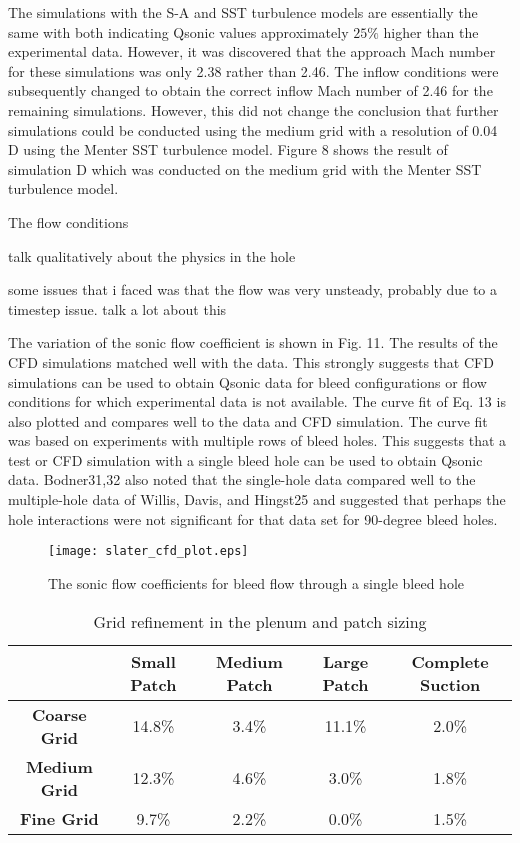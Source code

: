 The simulations with the S-A and SST turbulence models are essentially the same with both indicating Qsonic values approximately $25\%$ higher than the experimental data. However, it was discovered that the approach Mach number for these simulations was only 2.38 rather than 2.46. The inflow conditions were subsequently changed to obtain the correct inflow Mach number of 2.46 for the remaining simulations. However, this did not change the conclusion that further simulations could be conducted using the medium grid with a resolution of 0.04 D using the Menter SST turbulence model. Figure 8 shows the result of simulation D which was conducted on the medium grid with the Menter SST turbulence model.

The flow conditions 

talk qualitatively about the physics in the hole

some issues that i faced was that the flow was very unsteady, probably due to a timestep issue. talk a lot about this

The variation of the sonic flow coefficient is shown in Fig. 11. The results of the CFD simulations matched well with the data. This strongly suggests that CFD simulations can be used to obtain Qsonic data for bleed configurations or flow conditions for which experimental data is not available. The curve fit of Eq. 13 is also plotted and compares well to the data and CFD simulation. The curve fit was based on experiments with multiple rows of bleed holes. This suggests that a test or CFD simulation with a single bleed hole can be used to obtain Qsonic data. Bodner31,32 also noted that the single-hole data compared well to the multiple-hole data of Willis, Davis, and Hingst25 and suggested that perhaps the hole interactions were not significant for that data set for 90-degree bleed holes.

\begin{figure}[htbp] \begin{center}
    \texttt{[image: slater\_cfd\_plot.eps]}
    \caption{The sonic flow coefficients for bleed flow through a single bleed hole \cite{Shaw1976}}
     \label{fig:asdf} \end{center}
\end{figure}

\begin{table}[!htbp] \centering 
\begin{tabular}[c]{*{5}{c}} \hline
& \textbf{Small Patch} & \textbf{Medium Patch} & \textbf{Large Patch} & \textbf{Complete Suction} \\ \hline
\textbf{Coarse Grid} & 14.8\% & 3.4\% & 11.1\% & 2.0\% \\
\textbf{Medium Grid} & 12.3\% & 4.6\% &  3.0\% & 1.8\% \\
\textbf{Fine Grid}   &  9.7\% & 2.2\% &  0.0\% & 1.5\% \\ \hline
\end{tabular} 
\caption{Grid refinement in the plenum and patch sizing} 
\label{tab:results} \end{table}

